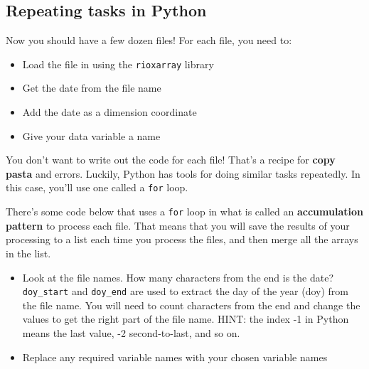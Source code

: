\documentclass[
  letterpaper,
  DIV=11,
  numbers=noendperiod,
  oneside]{scrreprt}
\providecommand{\tightlist}{%
  \setlength{\itemsep}{0pt}\setlength{\parskip}{0pt}}
\begin{document}
\subsection{Repeating tasks in
Python}\label{repeating-tasks-in-python-3}

Now you should have a few dozen files! For each file, you need to:

\begin{itemize}
\tightlist
\item
  Load the file in using the \texttt{rioxarray} library
\item
  Get the date from the file name
\item
  Add the date as a dimension coordinate
\item
  Give your data variable a name
\end{itemize}

You don't want to write out the code for each file! That's a recipe for
\textbf{copy pasta} and errors. Luckily, Python has tools for doing
similar tasks repeatedly. In this case, you'll use one called a
\texttt{for} loop.

There's some code below that uses a \texttt{for} loop in what is called
an \textbf{accumulation pattern} to process each file. That means that
you will save the results of your processing to a list each time you
process the files, and then merge all the arrays in the list.

\begin{tcolorbox}[enhanced jigsaw, colbacktitle=quarto-callout-color!10!white, opacityback=0, bottomtitle=1mm, toptitle=1mm, bottomrule=.15mm, left=2mm, colframe=quarto-callout-color-frame, leftrule=.75mm, opacitybacktitle=0.6, colback=white, rightrule=.15mm, toprule=.15mm, breakable, titlerule=0mm, title=\textcolor{quarto-callout-color}{\faInfo}\hspace{0.5em}{Try It}, coltitle=black, arc=.35mm]

\begin{itemize}
\tightlist
\item
  Look at the file names. How many characters from the end is the date?
  \texttt{doy\_start} and \texttt{doy\_end} are used to extract the day
  of the year (doy) from the file name. You will need to count
  characters from the end and change the values to get the right part of
  the file name. HINT: the index -1 in Python means the last value, -2
  second-to-last, and so on.
\item
  Replace any required variable names with your chosen variable names
\end{itemize}

\end{tcolorbox}
\end{document}
